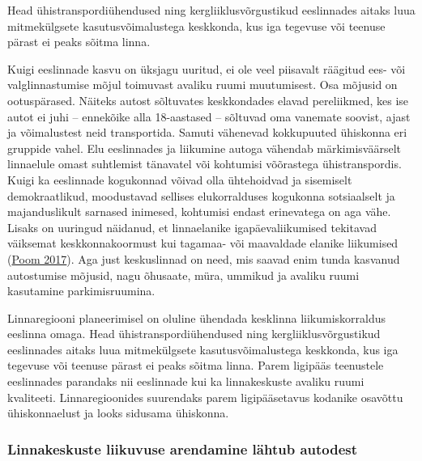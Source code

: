 \documentclass[estonian,]{article}
\begin{document}
\begin{blockquote-right}
Head ühistranspordiühendused ning kergliiklusvõrgustikud eeslinnades
aitaks luua mitmekülgsete kasutusvõimalustega keskkonda, kus iga
tegevuse või teenuse pärast ei peaks sõitma linna.
\end{blockquote-right}

Kuigi eeslinnade kasvu on üksjagu uuritud, ei ole veel piisavalt räägitud ees- või valglinnastumise mõjul toimuvast avaliku ruumi muutumisest. Osa mõjusid on ootuspärased. Näiteks autost sõltuvates keskkondades elavad pereliikmed, kes ise autot ei juhi -- ennekõike alla 18-aastased -- sõltuvad oma vanemate soovist, ajast ja võimalustest neid transportida. Samuti vähenevad kokkupuuted ühiskonna eri gruppide vahel. Elu eeslinnades ja liikumine autoga vähendab märkimisväärselt linnaelule omast suhtlemist tänavatel või kohtumisi võõrastega ühistranspordis. Kuigi ka eeslinnade kogukonnad võivad olla ühtehoidvad ja sisemiselt demokraatlikud, moodustavad sellises elukorralduses kogukonna sotsiaalselt ja majanduslikult sarnased inimesed, kohtumisi endast erinevatega on aga vähe. Lisaks on uuringud näidanud, et linnaelanike igapäevaliikumised tekitavad väiksemat keskkonnakoormust kui tagamaa- või maavaldade elanike liikumised (\protect\hyperlink{Poom2017}{Poom 2017}). Aga just keskuslinnad on need, mis saavad enim tunda kasvanud autostumise mõjusid, nagu õhusaate, müra, ummikud ja avaliku ruumi kasutamine parkimisruumina.

Linnaregiooni planeerimisel on oluline ühendada kesklinna liikumiskorraldus eeslinna omaga. Head ühistranspordiühendused ning kergliiklusvõrgustikud eeslinnades aitaks luua mitmekülgsete kasutusvõimalustega keskkonda, kus iga tegevuse või teenuse pärast ei peaks sõitma linna. Parem ligipääs teenustele eeslinnades parandaks nii eeslinnade kui ka linnakeskuste avaliku ruumi kvaliteeti. Linnaregioonides suurendaks parem ligipääsetavus kodanike osavõttu ühiskonnaelust ja looks sidusama ühiskonna.

\hypertarget{linnakeskuste-liikuvuse-arendamine-luxe4htub-autodest}{%
\subsubsection*{Linnakeskuste liikuvuse arendamine lähtub autodest}\label{linnakeskuste-liikuvuse-arendamine-luxe4htub-autodest}}
\end{document}
